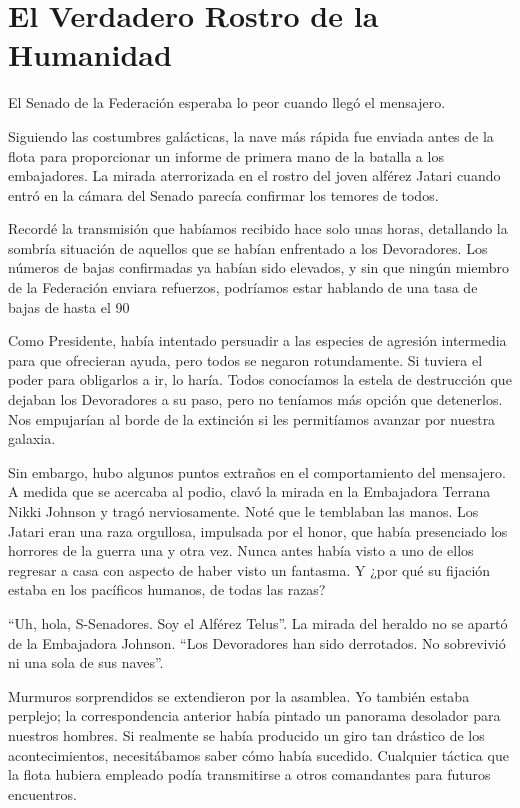 \chapter{El Verdadero Rostro de la Humanidad}\label{sec:el-verdadero-rostro-de-la-humanidad}


El Senado de la Federación esperaba lo peor cuando llegó el mensajero.

Siguiendo las costumbres galácticas, la nave más rápida fue enviada antes de la flota para proporcionar un informe de primera mano de la batalla a los embajadores. La mirada aterrorizada en el rostro del joven alférez Jatari cuando entró en la cámara del Senado parecía confirmar los temores de todos.

Recordé la transmisión que habíamos recibido hace solo unas horas, detallando la sombría situación de aquellos que se habían enfrentado a los Devoradores. Los números de bajas confirmadas ya habían sido elevados, y sin que ningún miembro de la Federación enviara refuerzos, podríamos estar hablando de una tasa de bajas de hasta el 90%

Como Presidente, había intentado persuadir a las especies de agresión intermedia para que ofrecieran ayuda, pero todos se negaron rotundamente. Si tuviera el poder para obligarlos a ir, lo haría. Todos conocíamos la estela de destrucción que dejaban los Devoradores a su paso, pero no teníamos más opción que detenerlos. Nos empujarían al borde de la extinción si les permitíamos avanzar por nuestra galaxia.

Sin embargo, hubo algunos puntos extraños en el comportamiento del mensajero. A medida que se acercaba al podio, clavó la mirada en la Embajadora Terrana Nikki Johnson y tragó nerviosamente. Noté que le temblaban las manos. Los Jatari eran una raza orgullosa, impulsada por el honor, que había presenciado los horrores de la guerra una y otra vez. Nunca antes había visto a uno de ellos regresar a casa con aspecto de haber visto un fantasma. Y ¿por qué su fijación estaba en los pacíficos humanos, de todas las razas?

``Uh, hola, S-Senadores. Soy el Alférez Telus''. La mirada del heraldo no se apartó de la Embajadora Johnson. ``Los Devoradores han sido derrotados. No sobrevivió ni una sola de sus naves''.

Murmuros sorprendidos se extendieron por la asamblea. Yo también estaba perplejo; la correspondencia anterior había pintado un panorama desolador para nuestros hombres. Si realmente se había producido un giro tan drástico de los acontecimientos, necesitábamos saber cómo había sucedido. Cualquier táctica que la flota hubiera empleado podía transmitirse a otros comandantes para futuros encuentros.

